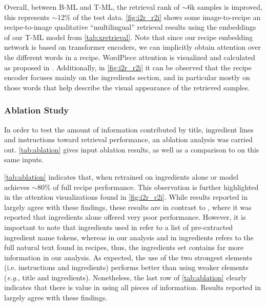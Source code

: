 \documentclass[sigconf,nonacm]{acmart}
\def\eg{\emph{e.g.}} \def\Eg{\emph{E.g.}}
\begin{document}
Overall, between B-ML and T-ML, the retrieval rank of $\sim$6k samples is improved, this represents $\sim$12\% of the test data. \autoref{fig:i2r_r2i} shows some image-to-recipe an recipe-to-image qualitative ``multilingual'' retrieval results using the embeddings of our  
T-ML model from \autoref{tab:xretrieval}. Note that since our recipe embedding network is based on transformer encoders, we can implicitly obtain attention over the different words in a recipe. WordPiece attention is visualized and calculated as proposed in \cite{Abnar2020}. Additionally, in \autoref{fig:i2r_r2i} it can be observed that the recipe encoder focuses mainly on the ingredients section, and in particular mostly on those words that 
help describe the visual appearance 
of the retrieved samples.



\subsubsection{\textbf{Ablation Study}}

In order to test the amount of information contributed by title, ingredient lines and instructions toward retrieval performance, an ablation analysis was carried out. 
\autoref{tab:ablation} gives input ablation results, as well as a comparison to \cite{salvador2021} on this same inputs. 

\autoref{tab:ablation} indicates that, when retrained on ingredients alone or model achieves $\sim$80\% of full recipe performance. This observation is further highlighted in the attention visualizations found in \autoref{fig:i2r_r2i}. While results reported in \cite{salvador2021} largely agree with these findings, these results are in contrast to \cite{chen2018}, where it was reported that ingredients alone offered very poor performance. However, it is important to note that ingredients used in \cite{chen2018} refer to a list of pre-extracted ingredient name tokens, whereas in our analysis and in \cite{salvador2021} ingredients refers to the full 
natural text found in recipes, thus, the ingredients set contains far more information in our analysis. As expected, the use of the two strongest elements (i.e. instructions and ingredients) performs better than using weaker elements (\eg, title and ingredients). Nonetheless, the last row of \autoref{tab:ablation} clearly indicates that there is value in using all pieces of information.
Results reported in \cite{salvador2021} largely agree with these findings.
\end{document}
